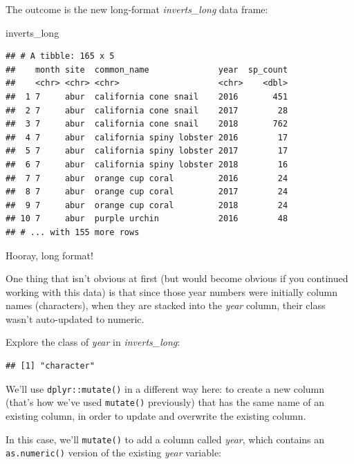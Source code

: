 \documentclass[]{book}
\newenvironment{Shaded}{\begin{snugshade}}{\end{snugshade}}
\newcommand{\KeywordTok}[1]{\textcolor[rgb]{0.13,0.29,0.53}{\textbf{#1}}}
\newcommand{\NormalTok}[1]{#1}
\newcommand{\OperatorTok}[1]{\textcolor[rgb]{0.81,0.36,0.00}{\textbf{#1}}}
\begin{document}
The outcome is the new long-format \emph{inverts\_long} data frame:

\begin{Shaded}
\begin{Highlighting}[]
\NormalTok{inverts_long}
\end{Highlighting}
\end{Shaded}

\begin{verbatim}
## # A tibble: 165 x 5
##    month site  common_name              year  sp_count
##    <chr> <chr> <chr>                    <chr>    <dbl>
##  1 7     abur  california cone snail    2016       451
##  2 7     abur  california cone snail    2017        28
##  3 7     abur  california cone snail    2018       762
##  4 7     abur  california spiny lobster 2016        17
##  5 7     abur  california spiny lobster 2017        17
##  6 7     abur  california spiny lobster 2018        16
##  7 7     abur  orange cup coral         2016        24
##  8 7     abur  orange cup coral         2017        24
##  9 7     abur  orange cup coral         2018        24
## 10 7     abur  purple urchin            2016        48
## # ... with 155 more rows
\end{verbatim}

Hooray, long format!

One thing that isn't obvious at first (but would become obvious if you continued working with this data) is that since those year numbers were initially column names (characters), when they are stacked into the \emph{year} column, their class wasn't auto-updated to numeric.

Explore the class of \emph{year} in \emph{inverts\_long}:

\begin{Shaded}
\end{Shaded}

\begin{verbatim}
## [1] "character"
\end{verbatim}

We'll use \texttt{dplyr::mutate()} in a different way here: to create a new column (that's how we've used \texttt{mutate()} previously) that has the same name of an existing column, in order to update and overwrite the existing column.

In this case, we'll \texttt{mutate()} to add a column called \emph{year}, which contains an \texttt{as.numeric()} version of the existing \emph{year} variable:
\end{document}
